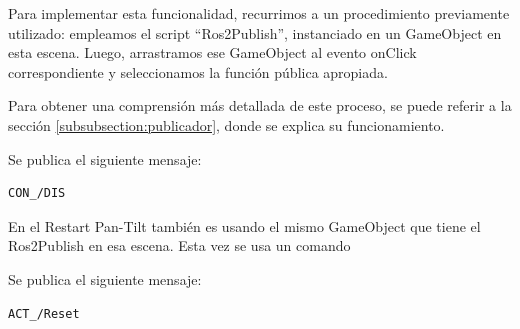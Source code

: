 Para implementar esta funcionalidad, recurrimos a un procedimiento previamente utilizado: empleamos el script ``Ros2Publish'', instanciado en un GameObject en esta escena. Luego, arrastramos ese GameObject al evento onClick correspondiente y seleccionamos la función pública apropiada.

Para obtener una comprensión más detallada de este proceso, se puede referir a la sección \ref{subsubsection:publicador}, donde se explica su funcionamiento.

Se publica el siguiente mensaje:
\begin{verbatim}
CON_/DIS
\end{verbatim}



En el Restart Pan-Tilt también es usando el mismo GameObject que tiene el Ros2Publish en esa escena. Esta vez se usa un comando 

Se publica el siguiente mensaje:
\begin{verbatim}
ACT_/Reset
\end{verbatim}









